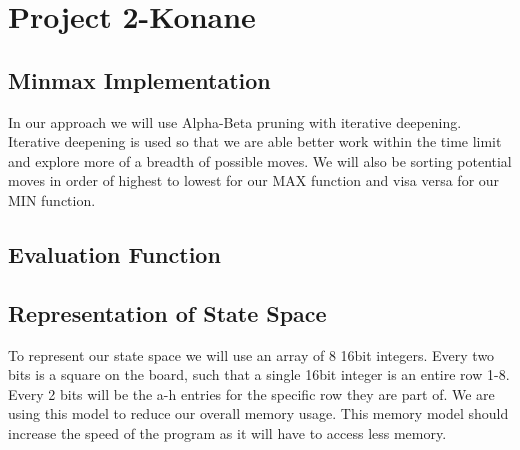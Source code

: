\documentclass[12pt]{article}
\begin{document}
\section*{Project 2-Konane}

\subsection*{Minmax Implementation}
In our approach we will use Alpha-Beta pruning with iterative deepening.
Iterative deepening is used so that we are able better work within the time limit and explore more of a breadth of possible moves.
We will also be sorting potential moves in order of highest to lowest for our MAX function and visa versa for our MIN function.

\subsection*{Evaluation Function}

\subsection*{Representation of State Space}
To represent our state space we will use an array of 8 16bit integers.
Every two bits is a square on the board, such that a single 16bit integer is an entire row 1-8.
Every 2 bits will be the a-h entries for the specific row they are part of.
We are using this model to reduce our overall memory usage.
This memory model should increase the speed of the program as it will have to access less memory.
\end{document}
